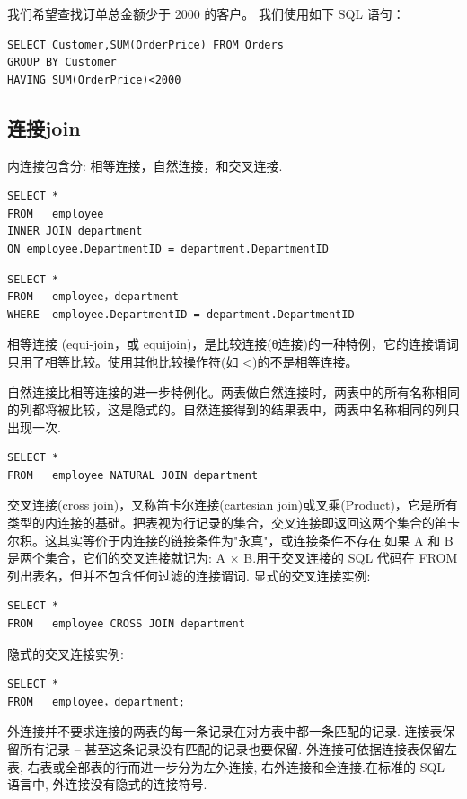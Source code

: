 我们希望查找订单总金额少于 2000 的客户。
我们使用如下 SQL 语句：
\begin{verbatim}
SELECT Customer,SUM(OrderPrice) FROM Orders
GROUP BY Customer
HAVING SUM(OrderPrice)<2000
\end{verbatim}


\subsection{连接join}

内连接包含分: 相等连接，自然连接，和交叉连接.

\begin{verbatim}
SELECT *
FROM   employee 
INNER JOIN department 
ON employee.DepartmentID = department.DepartmentID
\end{verbatim}

\begin{verbatim}
SELECT *  
FROM   employee，department 
WHERE  employee.DepartmentID = department.DepartmentID
\end{verbatim}

相等连接 (equi-join，或 equijoin)，是比较连接(θ连接)的一种特例，它的连接谓词只用了相等比较。使用其他比较操作符(如 <)的不是相等连接。

自然连接比相等连接的进一步特例化。两表做自然连接时，两表中的所有名称相同的列都将被比较，这是隐式的。自然连接得到的结果表中，两表中名称相同的列只出现一次.

\begin{verbatim}
SELECT *
FROM   employee NATURAL JOIN department
\end{verbatim}


交叉连接(cross join)，又称笛卡尔连接(cartesian join)或叉乘(Product)，它是所有类型的内连接的基础。把表视为行记录的集合，交叉连接即返回这两个集合的笛卡尔积。这其实等价于内连接的链接条件为"永真"，或连接条件不存在.如果 A 和 B 是两个集合，它们的交叉连接就记为: A × B.用于交叉连接的 SQL 代码在 FROM 列出表名，但并不包含任何过滤的连接谓词.
显式的交叉连接实例:

\begin{verbatim}
SELECT *
FROM   employee CROSS JOIN department
\end{verbatim}

隐式的交叉连接实例:

\begin{verbatim}
SELECT *
FROM   employee，department;
\end{verbatim}

外连接并不要求连接的两表的每一条记录在对方表中都一条匹配的记录. 连接表保留所有记录 -- 甚至这条记录没有匹配的记录也要保留. 外连接可依据连接表保留左表, 右表或全部表的行而进一步分为左外连接, 右外连接和全连接.在标准的 SQL 语言中, 外连接没有隐式的连接符号.

